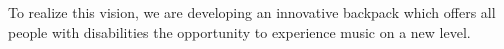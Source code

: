 To realize this vision, we are developing an innovative backpack which offers all people with disabilities the opportunity to experience music on a new level.
